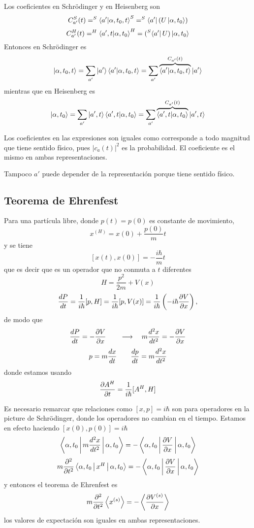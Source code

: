 \documentclass[10pt,oneside]{CBFT_book}
\begin{document}
Los coeficientes en Schrödinger y en Heisenberg son 
\[
	C_{a'}^S(t) = ^S\braket{a'|\alpha,t_0,t}^S = ^S\Bra{a'}(U\Ket{\alpha,t_0}) 
\]	
\[	
	C_{a'}^H(t) = ^H\braket{a',t|\alpha,t_0}^H = (^S\Bra{a'}U)\Ket{\alpha,t_0}
\]
Entonces en Schrödinger es 
\[
	\Ket{\alpha,t_0,t} = \sum_{a'} \Ket{a'}\braket{a'|\alpha,t_0,t} = 
	\sum_{a'} \overbrace{\braket{a'|\alpha,t_0,t}}^{C_{a'}(t)}\Ket{a'}
\]
mientras que en Heisenberg es 
\[
	\Ket{\alpha,t_0} = \sum_{a'} \Ket{a',t}\braket{a',t|\alpha,t_0} = 
	\sum_{a'} \overbrace{\braket{a',t|\alpha,t_0}}^{C_{a'}(t)}\Ket{a',t}
\]

Los coeficientes en las expresiones son iguales como corresponde a todo magnitud 
que tiene sentido físico, pues $|c_a(t)|^2$ es la probabilidad.
El coeficiente es el mismo en ambas representaciones.

Tampoco $a'$ puede depender de la representación porque tiene sentido físico.

\subsection{Teorema de Ehrenfest}

Para una partícula libre, donde $p(t)=p(0)$ es constante de movimiento,
\[
	x^{(H)} = x(0) + \frac{p(0)}{m}t
\]
y se tiene 
\[
	[x(t),x(0)] = -\frac{i\hbar}{m}t
\]
que es decir que es un operador que no conmuta a $t$ diferentes
\[
	H = \frac{p^2}{2m} + V(x)
\]
\[
	\dtot{P}{t} = \frac{1}{i\hbar}[p,H] = \frac{1}{i\hbar}[p,V(x)] = 
	\frac{1}{i\hbar}\left( -i\hbar\dpar{V}{x}\right),
\]
de modo que 
\[
	\dtot{P}{t} = -\dpar{V}{x} \qquad \longrightarrow \quad m \dtot[2]{x}{t} = -\dpar{V}{x} 
\]
\[
	p = m \dtot{x}{t} \qquad \dtot{p}{t} = m \dtot[2]{x}{t} 
\]
donde estamos usando 
\[
	\dpar{A^H}{t} = \frac{1}{i\hbar}[A^H,H]
\]

Es necesario remarcar que relaciones como $[x,p]=i\hbar$ son para operadores en la picture de Schrödinger, donde los 
operadores no cambian en el tiempo. Estamos en efecto haciendo $[x(0),p(0)]=i\hbar$
\[
	\Braket{\alpha,t_0|m \dtot[2]{x}{t}|\alpha,t_0} = - \Braket{\alpha,t_0|\dpar{V}{x}|\alpha,t_0}
\]
\[
	m\dpar[2]{}{t}\Braket{\alpha,t_0| x^H |\alpha,t_0} = -\Braket{\alpha,t_0|\dpar{V}{x}|\alpha,t_0}
\]
y entonces el teorema de Ehrenfest es 
\[
	m \dpar[2]{}{t} \Braket{x^{(s)}} = - \Braket{ \dpar{V^{(s)}}{x}}
\]
los valores de expectación son iguales en ambas representaciones.
\end{document}
